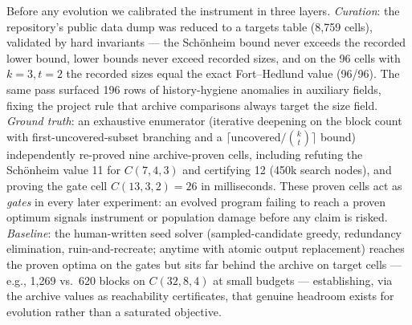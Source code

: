 Before any evolution we calibrated the instrument in three layers.
\emph{Curation}: the repository's public data dump was reduced to a
targets table (8{,}759 cells), validated by hard invariants --- the
Sch\"onheim bound never exceeds the recorded lower bound, lower
bounds never exceed recorded sizes, and on the 96 cells with
$k=3, t=2$ the recorded sizes equal the exact Fort--Hedlund value
\cite{fort1958minimal} (96/96). The same pass surfaced 196 rows of
history-hygiene anomalies in auxiliary fields, fixing the project
rule that archive comparisons always target the size field.
\emph{Ground truth}: an exhaustive enumerator (iterative deepening on
the block count with first-uncovered-subset branching and a
$\lceil\text{uncovered}/\binom{k}{t}\rceil$ bound) independently
re-proved nine archive-proven cells, including refuting the
Sch\"onheim value 11 for $C(7,4,3)$ and certifying 12 (450k search
nodes), and proving the gate cell $C(13,3,2)=26$ in milliseconds.
These proven cells act as \emph{gates} in every later experiment: an
evolved program failing to reach a proven optimum signals instrument
or population damage before any claim is risked. \emph{Baseline}:
the human-written seed solver (sampled-candidate greedy, redundancy
elimination, ruin-and-recreate; anytime with atomic output
replacement) reaches the proven optima on the gates but sits far
behind the archive on target cells --- e.g., 1{,}269 vs.\ 620 blocks
on $C(32,8,4)$ at small budgets --- establishing, via the archive
values as reachability certificates, that genuine headroom exists for
evolution rather than a saturated objective.
